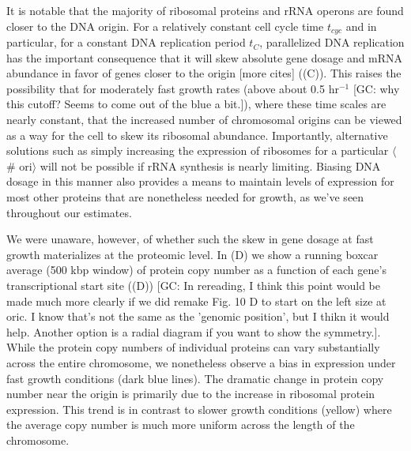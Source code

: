 It is notable that the majority of ribosomal proteins and rRNA operons are found
closer to the DNA origin. For a relatively constant cell cycle time $t_{cyc}$
and in particular, for a constant DNA replication period $t_C$, parallelized DNA
replication has the important consequence that it will skew absolute gene dosage
and mRNA abundance in favor of genes closer to the origin \citep{scholz2019}
[more cites] ((C)). This raises the possibility
that for moderately fast growth rates (above about 0.5 hr$^{-1}$
{\color{red}[GC: why this cutoff? Seems to come out of the blue a bit.]}), where these
time scales are nearly constant, that the increased number of chromosomal
origins can be viewed as a way for the cell to skew its ribosomal abundance.
Importantly, alternative solutions such as simply increasing the expression of
ribosomes for a particular $\langle$\# ori$\rangle$ will not be possible if rRNA
synthesis is nearly limiting. Biasing DNA dosage in this manner  also provides a
means to maintain levels of expression for most other proteins that are
nonetheless needed for growth, as we've seen throughout our estimates.

We were unaware, however, of whether such the skew in gene dosage at fast growth
materializes at the proteomic level. In (D) we show
a running boxcar average (500 kbp window) of protein copy number as a function
of each gene's transcriptional start site ((D))
{\color{red}[GC: In rereading, I think this point would be made much more
clearly if we did remake Fig. 10 D to start on the left size at oric. I know
that's not the same as the 'genomic position', but I thikn it would help.
Another option is a radial diagram if you want to show the symmetry.]}.
While the protein copy numbers of individual proteins can vary substantially
across the entire chromosome, we nonetheless observe a bias in expression under
fast growth conditions (dark blue lines). The dramatic change in protein copy
number near the origin is primarily due to the increase in ribosomal protein
expression. This trend is in contrast to slower growth conditions (yellow) where
the average copy number is much more uniform across the length of the chromosome.

